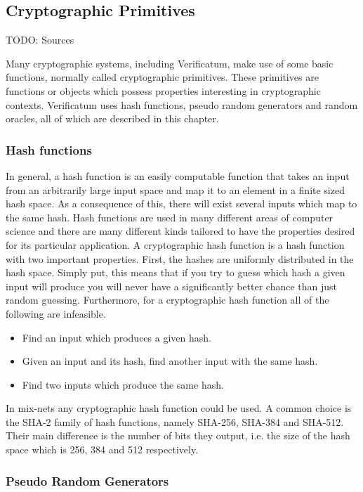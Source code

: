 \subsection{Cryptographic Primitives}

TODO: Sources

Many cryptographic systems, including Verificatum, make use of some
basic functions, normally called cryptographic primitives. These
primitives are functions or objects which possess properties
interesting in cryptographic contexts. Verificatum uses hash
functions, pseudo random generators and random oracles, all of which
are described in this chapter.

\subsubsection{Hash functions}
In general, a hash function is an easily computable function that
takes an input from an arbitrarily large input space and map it to an
element in a finite sized hash space.\cite[p.~321]{hac} As a consequence of this, there
will exist several inputs which map to the same hash. Hash functions
are used in many different areas of computer science and there are
many different kinds tailored to have the properties desired for its
particular application. A cryptographic hash function is a hash
function with two important properties. First, the hashes are
uniformly distributed in the hash space. Simply put, this means that
if you try to guess which hash a given input will produce you will
never have a significantly better chance than just random
guessing. Furthermore, for a cryptographic hash function all of the
following are infeasible.

\begin{itemize}
\item Find an input which produces a given hash.
\item Given an input and its hash, find another input with the same hash.
\item Find two inputs which produce the same hash.
\end{itemize}

In mix-nets any cryptographic hash function could be used. A
common choice is the SHA-2 family of hash functions, namely SHA-256,
SHA-384 and SHA-512. Their main difference is the number of bits they
output, i.e. the size of the hash space which is 256, 384 and 512
respectively.

\subsubsection{Pseudo Random Generators}

